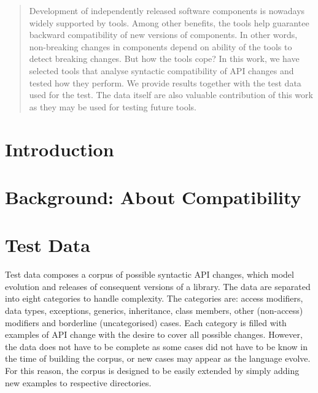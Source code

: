 \documentclass[conference]{IEEEtran}
\begin{document}




\maketitle

\begin{abstract}
Development of independently released software components is nowadays widely supported by tools.
Among other benefits, the tools help guarantee backward compatibility of new versions of components. 
In other words, non-breaking changes in components depend on ability of the tools to detect breaking changes.
But how the tools cope? In this work, we have selected tools that analyse syntactic compatibility of API changes
and tested how they perform. We provide results together with the test data used for the test. The data itself
are also valuable contribution of this work as they may be used for testing future tools.
\end{abstract}





%
\IEEEpeerreviewmaketitle

\section{Introduction}

\section{Background: About Compatibility}

\section{Test Data}

Test data composes a corpus of possible syntactic API changes, which model evolution and releases of consequent versions of a library. 
The data are separated into eight categories to handle complexity. The categories are: access modifiers, data types, exceptions, generics, inheritance, class members, other (non-access) modifiers and borderline (uncategorised) cases. Each category is filled with examples of API change with the desire to cover all possible changes. However, the data does not have to be complete as some cases did not have to be know in the time of building the corpus, or new cases may appear as the language evolve. For this reason, the corpus is designed to be easily extended by simply adding new examples to respective directories.
\end{document}
